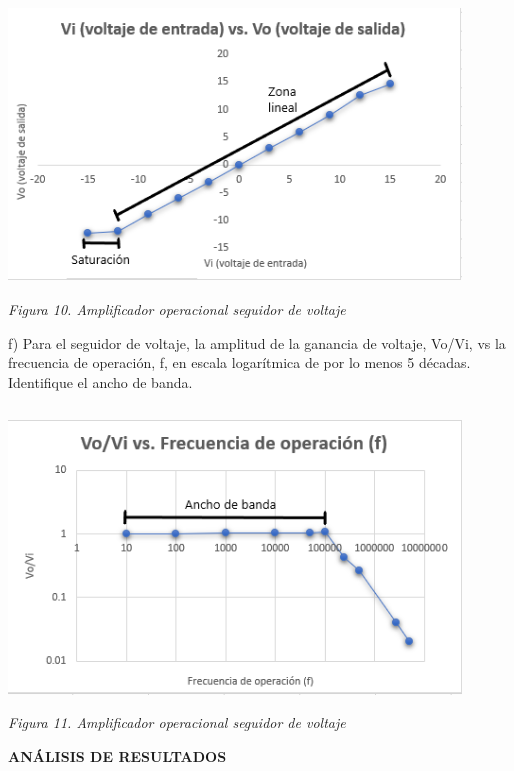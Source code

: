 \documentclass[12pt]{article}
\begin{document}
	\begin{center}
		\includegraphics[width=12cm,height=8cm]{Img/graf5}\\
		\textit{Figura 10. Amplificador operacional seguidor de voltaje}\\
	\end{center}
	
	f) Para el seguidor de voltaje, la amplitud de la ganancia de voltaje, Vo/Vi, vs la frecuencia de operación, f, en escala logarítmica de por lo menos 5 décadas. Identifique el ancho de banda.\\
	
	\begin{center}
		\includegraphics[width=12cm,height=8cm]{Img/graf6}\\
		\textit{Figura 11. Amplificador operacional seguidor de voltaje}\\
	\end{center}
	
	\newpage
	
	\begin{center}
		\textbf{\large ANÁLISIS DE RESULTADOS}\\
	\end{center}
	
\end{document}
